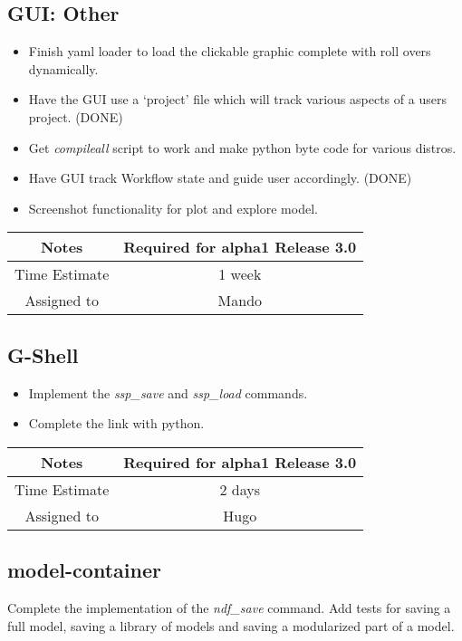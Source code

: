\documentclass[12pt]{article}
\begin{document}
\subsection{GUI: Other}
\begin{itemize}
\item Finish yaml loader to load the clickable graphic complete with
  roll overs dynamically.
\item Have the GUI use a `project' file which will track various
  aspects of a users project. (DONE)
\item Get {\it compileall} script to work and make python byte code for
  various distros.
\item Have GUI track Workflow state and guide user accordingly. (DONE)
\item Screenshot functionality for plot and explore model.
\end{itemize}

{
  \vspace{5mm}
  \centering
  \begin{tabular}{|c|c|}
    \hline
    Notes
    & Required for alpha1 Release 3.0 \\
    \hline
    Time Estimate
    & 1 week \\
    \hline
    Assigned to
    & Mando \\
    \hline
  \end{tabular}
}


\subsection{G-Shell}
\begin{itemize}
\item Implement the {\it ssp\_save} and {\it ssp\_load} commands.
\item Complete the link with python.
\end{itemize}

{
  \vspace{5mm}
  \centering
  \begin{tabular}{|c|c|}
    \hline
    Notes
    & Required for alpha1 Release 3.0 \\
    \hline
    Time Estimate
    & 2 days \\
    \hline
    Assigned to
    & Hugo \\
    \hline
  \end{tabular}
}


\subsection{model-container}
Complete the implementation of the {\it ndf\_save} command.  Add tests for
saving a full model, saving a library of models and saving a
modularized part of a model.
\end{document}
